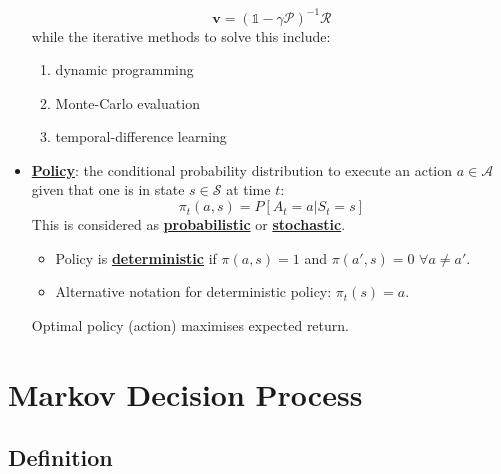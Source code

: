 \documentclass[twocolumn,landscape,10pt]{article}
\theoremstyle{definition}
\begin{document}
\begin{itemize}
        \[
            \mathbf{v}=(\mathds{1}-\gamma\mathcal{P})^{-1}\mathcal{R}
        \]
        while the iterative methods to solve this include:
        \begin{enumerate}
            \item dynamic programming
            \item Monte-Carlo evaluation
            \item temporal-difference learning
        \end{enumerate}
    \item \textbf{\underline{Policy}}: the
        conditional probability distribution to execute an action
        $a\in\mathcal{A}$ given that one is in state $s\in\mathcal{S}$ at time
        $t$:
        \[
            \pi_t(a,s)=P[A_t=a|S_t=s]
        \]
        This is considered as \textbf{\underline{probabilistic}} or
        \textbf{\underline{stochastic}}.
        \begin{itemize}
            \item Policy is \textbf{\underline{deterministic}} if
                $\pi(a,s)=1$ and $\pi(a',s)=0$ $\forall a\neq a'$.
            \item Alternative notation for deterministic policy: $\pi_t(s)=a$.
        \end{itemize}
        Optimal policy (action) maximises expected return.
\end{itemize}

\section{Markov Decision Process}

\subsection{Definition}
\end{document}
